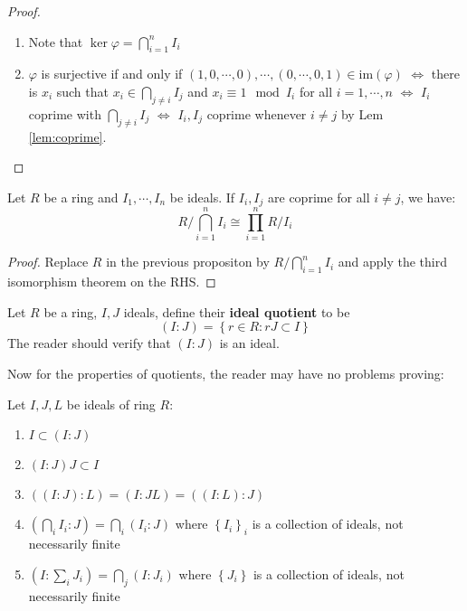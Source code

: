 \documentclass{note-eng}
\begin{document}
\begin{proof}
    \begin{enumerate}
        \item Note that $\ker \varphi = \bigcap\limits_{i = 1}^{n} I_i$
        \item $\varphi$ is surjective if and only if $(1, 0, \cdots, 0), \cdots, (0, \cdots, 0, 1) \in \mathrm{im}(\varphi)$ $\Leftrightarrow$ there is $x_i$ such that $x_i \in \bigcap\limits_{j \ne i} I_j$ and $x_i \equiv 1 \mod I_i$ for all $i = 1, \cdots, n$ $\Leftrightarrow$ $I_i$ coprime with $\bigcap\limits_{j \ne i} I_j$ $\Leftrightarrow$ $I_i, I_j$ coprime whenever $i \ne j$ by Lem \ref{lem:coprime}.
    \end{enumerate}
\end{proof}

\begin{corollary}
    Let $R$ be a ring and $I_1, \cdots, I_n$ be ideals. If $I_i, I_j$ are coprime for all $i \ne j$, we have:
    $$R / \bigcap\limits_{i = 1}^{n} I_i \cong \prod\limits_{i = 1}^{n} R / I_i$$
\end{corollary}

\begin{proof}
    Replace $R$ in the previous propositon by $R / \bigcap\limits_{i = 1}^{n} I_i$ and apply the third isomorphism theorem on the RHS.
\end{proof}

\begin{definition}
    Let $R$ be a ring, $I, J$ ideals, define their \textbf{ideal quotient} to be
    $$(I:J) = \left\lbrace r \in R: rJ \subset I \right\rbrace$$
    The reader should verify that $(I:J)$ is an ideal.
\end{definition}

Now for the properties of quotients, the reader may have no problems proving:

\begin{proposition}
    Let $I, J, L$ be ideals of ring $R$:
    \begin{enumerate}
        \item $I \subset (I:J)$
        \item $(I : J) J \subset I$
        \item $((I:J):L) = (I:JL) = ((I:L):J)$
        \item $(\bigcap\limits_{i}I_i:J) = \bigcap\limits_{i} (I_i:J)$ where $\left\lbrace I_i \right\rbrace_i$ is a collection of ideals, not necessarily finite
        \item $(I: \sum\limits_{i}J_i) = \bigcap\limits_{j} (I : J_i)$ where $\left\lbrace J_i \right\rbrace$ is a collection of ideals, not necessarily finite
    \end{enumerate}
\end{proposition}
\end{document}
